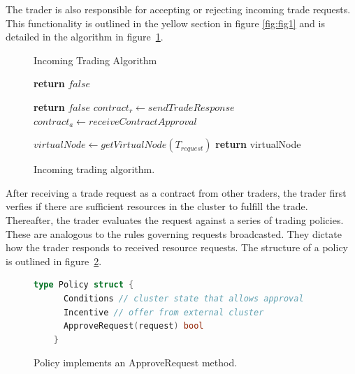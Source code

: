The trader is also responsible for accepting or rejecting incoming trade
requests. This functionality is outlined in the yellow section in figure \ref{fig:fig1}
and is detailed in the algorithm in figure~\ref{incoming}.

\begin{figure}[H]
\begin{algorithm}[H]
\caption{Incoming Trading Algorithm}
\begin{algorithmic}
   
    
     
      \State \textbf{return} $false$ 
    \EndIf

      \State \textbf{return} $false$ 
      \EndIf
    \EndFor
    \State $contract_r \gets sendTradeResponse$ 
    \State $contract_a \gets receiveContractApproval$ 

    \State $virtualNode \gets getVirtualNode(T_{request})$     
    \State \textbf{return} virtualNode 
  \EndProcedure
\end{algorithmic}
\end{algorithm}
\caption{Incoming trading algorithm.}
\label{incoming}
\end{figure}

After receiving a trade request as a contract from other traders, the trader
first verfies if there are sufficient resources in the cluster to fulfill the
trade. Thereafter, the trader evaluates the request against a series of trading
policies. These are analogous to the rules governing requests broadcasted. They
dictate how the trader responds to received resource requests. The structure of
a policy is outlined in figure~\ref{policy}.

\begin{figure}[H]
  \begin{lstlisting}[language=go]
    type Policy struct {
      Conditions // cluster state that allows approval
      Incentive // offer from external cluster
      ApproveRequest(request) bool 
    } 
  \end{lstlisting}
  \caption{Policy implements an ApproveRequest method.}
  \label{policy}
\end{figure}

